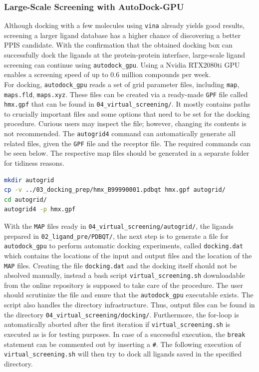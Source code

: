 \documentclass[9pt,tutorial]{livecoms}
\newcommand{\code}[1]{\colorbox{light-gray}{\texttt{#1}}}
\begin{document}
\subsubsection*{Large-Scale Screening with AutoDock-GPU}
Although docking with a few molecules using \code{vina} already yields good results, screening a larger ligand database has a higher chance of discovering a better PPIS candidate. With the confirmation that the obtained docking box can successfully dock the ligands at the protein-protein interface, large-scale ligand screening can continue using \code{autodock\_gpu}. Using a Nvidia RTX2080ti GPU enables a screening speed of up to 0.6 million compounds per week.\\
For docking, \code{autodock\_gpu} reads a set of grid parameter files, including \code{map}, \code{maps.fld}, \code{maps.xyz}. These files can be created via a ready-made \texttt{GPF} file called \code{hmx.gpf} that can be found in \code{04\_virtual\_screening/}. It mostly contains paths to crucially important files and some options that need to be set for the docking procedure. Curious users may inspect the file; however, changing its contents is not recommended. The \code{autogrid4} command can automatically generate all related files, given the \texttt{GPF} file and the receptor file. The required commands can be seen below. The respective map files should be generated in a separate folder for tidiness reasons.
\begin{lstlisting}[language=bash]
mkdir autogrid
cp -v ../03_docking_prep/hmx_B99990001.pdbqt hmx.gpf autogrid/
cd autogrid/
autogrid4 -p hmx.gpf
\end{lstlisting}
With the \texttt{MAP} files ready in \code{04\_virtual\_screening/autogrid/}, the ligands prepared in \code{02\_ligand\_pre/PDBQT/}, the next step is to generate a file for \code{autodock\_gpu} to perform automatic docking experiments, called \code{docking.dat} which contains the locations of the input and output files and the location of the \texttt{MAP} files. Creating the file \code{docking.dat} and the docking itself should not be absolved manually, instead a bash script \code{virtual\_screening.sh} downloadable from the online repository is supposed to take care of the procedure. The user should scrutinize the file and enure that the \code{autodock\_gpu} executable exists. The script also handles the directory infrastructure. Thus, output files can be found in the directory \code{04\_virtual\_screening/docking/}. Furthermore, the for-loop is automatically aborted after the first iteration if \code{virtual\_screening.sh} is executed as is for testing purposes. In case of a successful execution, the \code{break} statement can be commented out by inserting a \code{\#}. The following execution of \code{virtual\_screening.sh} will then try to dock all ligands saved in the specified directory.
\end{document}
